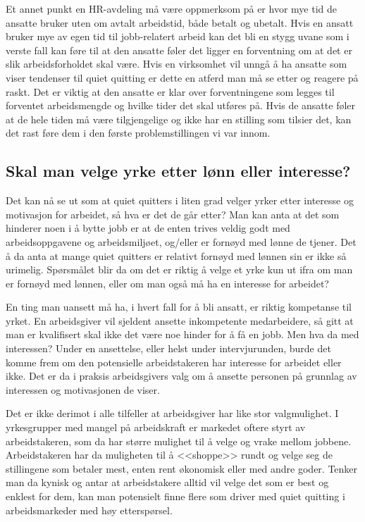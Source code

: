 \documentclass[a4paper, 12pt]{article}  %
\begin{document}
Et annet punkt en HR-avdeling må være oppmerksom på er hvor mye tid de ansatte bruker uten om avtalt arbeidstid, både betalt og ubetalt. 
Hvis en ansatt bruker mye av egen tid til jobb-relatert arbeid kan det bli en stygg uvane som i verste fall kan føre til at den ansatte føler det ligger en forventning om at det er slik arbeidsforholdet skal være.
Hvis en virksomhet vil unngå å ha ansatte som viser tendenser til quiet quitting er dette en atferd man må se etter og reagere på raskt.
Det er viktig at den ansatte er klar over forventningene som legges til forventet arbeidsmengde og hvilke tider det skal utføres på.
Hvis de ansatte føler at de hele tiden må være tilgjengelige og ikke har en stilling som tilsier det, kan det rast føre dem i den første problemstillingen vi var innom.

\subsection{Skal man velge yrke etter lønn eller interesse?}

Det kan nå se ut som at quiet quitters i liten grad velger yrker etter interesse og motivasjon for arbeidet, så hva er det de går etter?
Man kan anta at det som hinderer noen i å bytte jobb er at de enten trives veldig godt med arbeidsoppgavene og arbeidsmiljøet, og/eller er fornøyd med lønne de tjener. 
Det å da anta at mange quiet quitters er relativt fornøyd med lønnen sin er ikke så urimelig. Spørsmålet blir da om det er riktig å velge et yrke kun ut ifra om man er fornøyd med lønnen, eller om man også må ha en interesse for arbeidet?

En ting man uansett må ha, i hvert fall for å bli ansatt, er riktig kompetanse til yrket.
En arbeidsgiver vil sjeldent ansette inkompetente medarbeidere, så gitt at man er kvalifisert skal ikke det være noe hinder for å få en jobb. 
Men hva da med interessen? 
Under en ansettelse, eller helst under intervjurunden, burde det komme frem om den potensielle arbeidstakeren har interesse for arbeidet eller ikke.
Det er da i praksis arbeidsgivers valg om å ansette personen på grunnlag av interessen og motivasjonen de viser.

Det er ikke derimot i alle tilfeller at arbeidsgiver har like stor valgmulighet.
I yrkesgrupper med mangel på arbeidskraft er markedet oftere styrt av arbeidstakeren, som da har større mulighet til å velge og vrake mellom jobbene.
Arbeidstakeren har da muligheten til å <<shoppe>> rundt og velge seg de stillingene som betaler mest, enten rent økonomisk eller med andre goder.
Tenker man da kynisk og antar at arbeidstakere alltid vil velge det som er best og enklest for dem, kan man potensielt finne flere som driver med quiet quitting i arbeidsmarkeder med høy etterspørsel.
\end{document}
